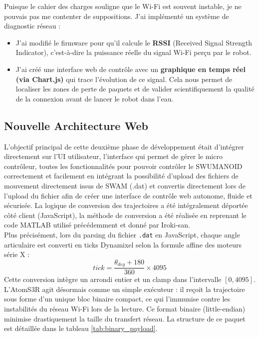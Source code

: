 \documentclass{tropLaClasse}
\begin{document}
Puisque le cahier des charges souligne que le Wi-Fi est souvent instable, je ne pouvais pas me contenter de suppositions. J'ai implémenté un système de diagnostic réseau :
\begin{itemize}
    \item J'ai modifié le firmware pour qu'il calcule le \textbf{RSSI} (Received Signal Strength Indicator), c'est-à-dire la puissance réelle du signal Wi-Fi perçu par le robot.
    \item J'ai créé une interface web de contrôle avec un \textbf{graphique en temps réel (via Chart.js)} qui trace l'évolution de ce signal. Cela nous permet de localiser les zones de perte de paquets et de valider scientifiquement la qualité de la connexion avant de lancer le robot dans l'eau.
\end{itemize}


\subsection{Nouvelle Architecture Web}
L'objectif principal de cette deuxième phase de développement était d'intégrer directement sur l'UI utilisateur, l'interface qui permet de gérer le micro contrôleur, toutes les fonctionnalités pour pouvoir contrôler le SWUMANOID correctement et facilement en intégrant la possibilité d'upload des fichiers de mouvement directement issus de SWAM (.dat) et convertis directement lors de l'upload du fichier afin de créer une interface de contrôle web autonome, fluide et sécurisée. La logique de conversion des trajectoires a été intégralement déportée côté client (JavaScript), la méthode de conversion a été réalisée en reprenant le code MATLAB utilisé précédemment et donné par Iroki-san.\\

Plus précisément, lors du parsing du fichier \texttt{.dat} en JavaScript, chaque angle articulaire est converti en ticks Dynamixel selon la formule affine des moteurs série X :
\begin{equation}
tick = \frac{\theta_{deg}+180}{360} \times 4095
\end{equation}
Cette conversion intègre un arrondi entier et un clamp dans l'intervalle $[0, 4095]$.\\

L'AtomS3R agit désormais comme un simple exécuteur : il reçoit la trajectoire sous forme d'un unique bloc binaire compact, ce qui l'immunise contre les instabilités du réseau Wi-Fi lors de la lecture. Ce format binaire (little-endian) minimise drastiquement la taille du transfert réseau. La structure de ce paquet est détaillée dans le tableau \ref{tab:binary_payload}.
\end{document}

